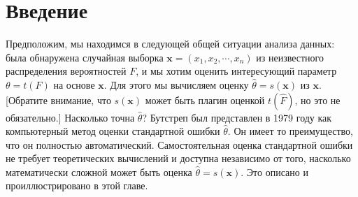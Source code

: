 \section{Введение}

Предположим, мы находимся в следующей общей ситуации анализа данных: была обнаружена случайная выборка $\mathbf{x} = (x_1, x_2, \cdots, x_n)$ из неизвестного распределения вероятностей $F$, и мы хотим оценить интересующий параметр $\theta = t (F)$ на основе $\mathbf{x}$. Для этого мы вычисляем оценку $\hat\theta = s (\mathbf{x})$ из $\mathbf{x}$. [Обратите внимание, что $s (\mathbf{x})$ может быть плагин оценкой $t (\hat F)$, но это не обязательно.] Насколько точна $\hat\theta$? Бутстреп был представлен в 1979 году как компьютерный метод оценки стандартной ошибки $\hat\theta$. Он имеет то преимущество, что он полностью автоматический. Самостоятельная оценка стандартной ошибки не требует теоретических вычислений и доступна независимо от того, насколько математически сложной может быть оценка $\hat\theta = s (\mathbf{x})$. Это описано и проиллюстрировано в этой главе. 